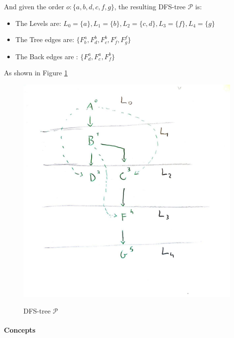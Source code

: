 \documentclass[10pt,a4paper]{article}
\begin{document}
And given the order $o: \{a,b,d,c,f,g\}$, the resulting DFS-tree $\mathcal{P}$ is:
\begin{itemize}
\item The Levels are: $L_0=\{a\},L_1=\{b\},L_2=\{c,d\},L_3=\{f\},L_4=\{g\}$
\item The Tree edges are: $\{F^a_b,F^b_d,F^b_c,F^c_f,F^f_g\}$
\item The Back edges are : $\{F^a_d,F^a_c,F^b_f\}$
\end{itemize}

As shown in Figure \ref{fig:dfs_p}

\begin{figure}[H]
\centering
\includegraphics[scale=0.15]{images/dfs-tree_2.jpg}\\
\caption{DFS-tree $\mathcal{P}$}
\label{fig:dfs_p}
\end{figure}

\paragraph{Concepts}
\end{document}
